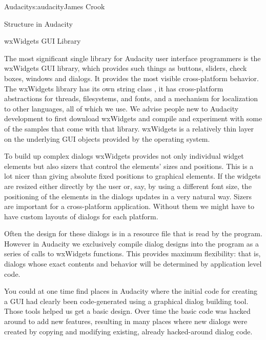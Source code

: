 \begin{aosachapter}{Audacity}{s:audacity}{James Crook}
\begin{aosasect1}{Structure in Audacity}
\end{aosasect1}

\begin{aosasect1}{wxWidgets GUI Library}

The most significant single library for Audacity user interface
programmers is the wxWidgets GUI library, which provides such
things as buttons, sliders, check boxes, windows and dialogs.  It provides
the most visible cross-platform behavior.  The wxWidgets library has
its own string class , it has cross-platform
abstractions for threads, filesystems, and fonts, and a mechanism for
localization to other languages, all of which we use.  We advise
people new to Audacity development to first download wxWidgets and
compile and experiment with some of the samples that come with that
library.  wxWidgets is a relatively thin layer on the underlying GUI
objects provided by the operating system.

To build up complex dialogs wxWidgets provides not only individual
widget elements but also sizers that control the elements' sizes
and positions.  This is a lot nicer than giving absolute fixed
positions to graphical elements.  If the widgets are resized either
directly by the user or, say, by using a different font size, the
positioning of the elements in the dialogs updates in a very natural
way.  Sizers are important for a cross-platform application.  Without
them we might have to have custom layouts of dialogs for each
platform.

Often the design for these dialogs is in a resource file that is
read by the program.  However in Audacity we exclusively compile
dialog designs into the program as a series of calls to wxWidgets
functions.  This provides maximum flexibility: that is, dialogs whose
exact contents and behavior will be determined by application level
code.

You could at one time find places in Audacity where the initial code
for creating a GUI had clearly been code-generated using a graphical
dialog building tool.  Those tools helped us get a basic design.  Over
time the basic code was hacked around to add new features,
resulting in many places where new dialogs were created by
copying and modifying existing, already hacked-around
dialog code.


\end{aosasect1}
\end{aosachapter}
